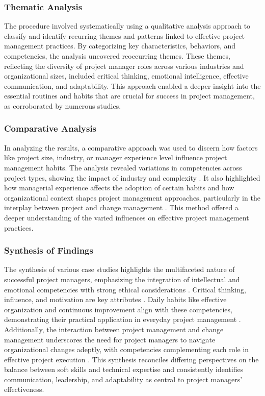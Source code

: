 \documentclass{article}
\begin{document}
\subsubsection{Thematic Analysis}

The procedure involved systematically using a qualitative analysis approach to classify and identify recurring themes and patterns linked to effective project management practices. By categorizing key characteristics, behaviors, and competencies, the analysis uncovered reoccurring themes. These themes, reflecting the diversity of project manager roles across various industries and organizational sizes, included critical thinking, emotional intelligence, effective communication, and adaptability. This approach enabled a deeper insight into the essential routines and habits that are crucial for success in project management, as corroborated by numerous studies.


\subsubsection{Comparative Analysis}

In analyzing the results, a comparative approach was used to discern how factors like project size, industry, or manager experience level influence project management habits. The analysis revealed variations in competencies across project types, showing the impact of industry and complexity \cite{muller2010leadership}. It also highlighted how managerial experience affects the adoption of certain habits \cite{sigurdhssonpatterns} and how organizational context shapes project management approaches, particularly in the interplay between project and change management \cite{pollack2016project}. This method offered a deeper understanding of the varied influences on effective project management practices.

\subsubsection{Synthesis of Findings}

The synthesis of various case studies highlights the multifaceted nature of successful project managers, emphasizing the integration of intellectual and emotional competencies with strong ethical considerations \cite{bredillet2015good}. Critical thinking, influence, and motivation are key attributes \cite{muller2010leadership}. Daily habits like effective organization and continuous improvement align with these competencies, demonstrating their practical application in everyday project management \cite{sigurdhssonpatterns}. Additionally, the interaction between project management and change management underscores the need for project managers to navigate organizational changes adeptly, with competencies complementing each role in effective project execution \cite{pollack2016project}. This synthesis reconciles differing perspectives on the balance between soft skills and technical expertise and consistently identifies communication, leadership, and adaptability as central to project managers' effectiveness.
\end{document}

